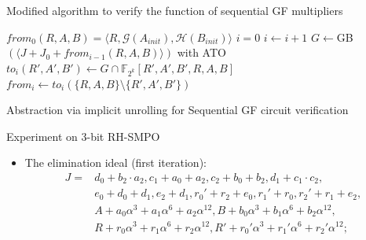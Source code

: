 \documentclass[xcolor=dvipsnames]{beamer}
\newcommand{\bi}{\begin{itemize}}
\newcommand{\ei}{\end{itemize}}
\begin{document}
\begin{frame}{\large{Modified algorithm to verify the function of sequential GF multipliers}}
\begin{algorithm}[H] %
\SetAlgoNoLine

  $from_0(R,A,B) = \langle R, \mathcal{G}(A_{init}), \mathcal{H}(B_{init})\rangle$\;
  $i = 0$\;
  {
  	$i \gets i + 1$\;
	$G \gets$GB$( \langle J + J_0+ from_{i-1}(R,A,B) \rangle)$ with ATO\;
	$to_i(R',A',B')\gets G\cap \mathbb F_{2^k}[R',A',B',R,A,B]$\;
	$from_i \gets to_i(\{R,A,B\}\setminus \{R',A',B'\})$\;
  }
\caption {Abstraction via implicit unrolling for Sequential GF circuit verification}
\end{algorithm}
\end{frame}
\begin{frame}{\large{Experiment on 3-bit RH-SMPO}}
\begin{figure}[hbt]
\end{figure}
\vspace{-0.2in}
\bi
\item The elimination ideal (first iteration):
\begin{align*}
J = &d_0+b_2\cdot a_2,
c_1+a_0+a_2,
c_2+b_0+b_2,
d_1+c_1\cdot c_2,\\
&e_0+d_0+d_1,
e_2+d_1,
r_0'+r_2+e_0,
r_1'+r_0,
r_2'+r_1+e_2,\\
&A+a_0\alpha^3+a_1\alpha^6+a_2\alpha^{12},
B+b_0\alpha^3+b_1\alpha^6+b_2\alpha^{12},\\
&R+r_0\alpha^3+r_1\alpha^6+r_2\alpha^{12},
R'+r_0'\alpha^3+r_1'\alpha^6+r_2'\alpha^{12};
\end{align*}
\ei
\end{frame}
\end{document}
